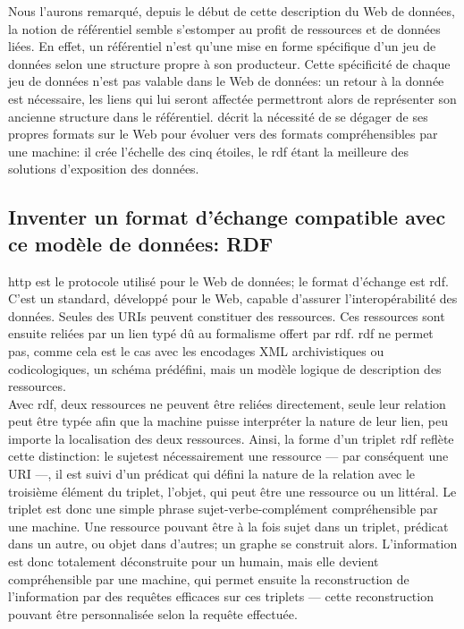 Nous l'aurons remarqué, depuis le début de cette description du Web de données, la notion de référentiel semble s'estomper au profit de ressources et de données liées. En effet, un référentiel n'est qu'une mise en forme spécifique d'un jeu de données selon une structure propre à son producteur. Cette spécificité de chaque jeu de données n'est pas valable dans le Web de données: un retour à la donnée est nécessaire, les liens qui lui seront affectée permettront alors de représenter son ancienne structure dans le référentiel.  décrit la nécessité de se dégager de ses propres formats sur le Web pour évoluer vers des formats compréhensibles par une machine: il crée l'échelle des cinq étoiles, le \ac{rdf} étant la meilleure des solutions d'exposition des données.

\subsection{\label{II-A-1-b}Inventer un format d'échange compatible avec ce modèle de données: RDF}

\ac{http} est le protocole utilisé pour le Web de données; le format d'échange est \ac{rdf}. C'est un standard, développé pour le Web, capable d'assurer l'interopérabilité des données. Seules des URIs peuvent constituer des ressources. Ces ressources sont ensuite reliées par un lien typé dû au formalisme offert par \ac{rdf}. \ac{rdf} ne permet pas, comme cela est le cas avec les encodages XML archivistiques ou codicologiques, un schéma prédéfini, mais un modèle logique de description des ressources.\\

Avec \ac{rdf}, deux ressources ne peuvent être reliées directement, seule leur relation peut être typée afin que la machine puisse interpréter la nature de leur lien, peu importe la localisation des deux ressources. Ainsi, la forme d'un triplet \ac{rdf} reflète cette distinction: le \og sujet\fg est nécessairement une ressource --- par conséquent une URI ---, il est suivi d'un \og prédicat\fg{} qui défini la nature de la relation avec le troisième élément du triplet, l'\og objet\fg{}, qui peut être une ressource ou un littéral. Le triplet est donc une simple phrase sujet-verbe-complément compréhensible par une machine. Une ressource pouvant être à la fois sujet dans un triplet, prédicat dans un autre, ou objet dans d'autres; un graphe se construit alors. L'information est donc totalement déconstruite pour un humain, mais elle devient compréhensible par une machine, qui permet ensuite la reconstruction de l'information par des requêtes efficaces sur ces triplets --- cette reconstruction pouvant être personnalisée selon la requête effectuée.

